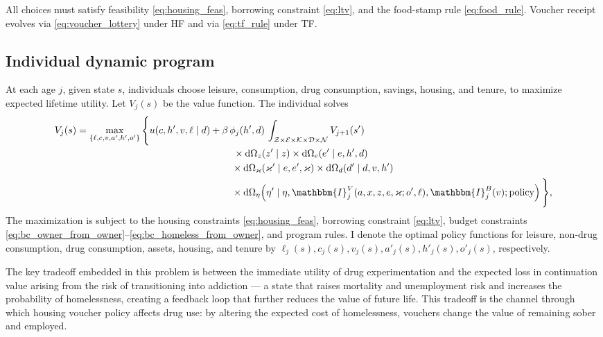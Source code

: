 \documentclass[parskip=full]{article}
\theoremstyle{plain}
\theoremstyle{definition}
\theoremstyle{remark}
\begin{document}
All choices must satisfy feasibility \eqref{eq:housing_feas}, borrowing constraint \eqref{eq:ltv}, and the food-stamp rule \eqref{eq:food_rule}. Voucher receipt evolves via \eqref{eq:voucher_lottery} under HF and via \eqref{eq:tf_rule} under TF.

\subsection{Individual dynamic program}\label{sec:hh}

At each age $j$, given state $s$, individuals choose leisure, consumption, drug consumption, savings, housing, and tenure, to maximize expected lifetime utility. Let $V_j(s)$ be the value function. The individual solves
\begin{equation}\label{eq:bellman}
\begin{alignedat}{2}
V_j(s)&=\max_{\{\ell,c,v,a',h',o'\}}\Bigg\{u(c,h',v,\ell\mid d)
+\beta\,\phi_j(h',d)\,\int_{\mathcal{Z}\times\mathcal{E}\times\mathcal{K}\times\mathcal{D}\times\mathcal{N}} V_{j+1}(s') \\[-0.25ex]
&\qquad\qquad\qquad\qquad\qquad\qquad\qquad\qquad
\,\times \mathrm{d}\Omega_z(z'\mid z)\times \mathrm{d}\Omega_e(e'\mid e,h',d) \\ &\qquad\qquad\qquad\qquad\qquad\qquad\qquad\qquad 
\times \mathrm{d}\Omega_{\varkappa}(\varkappa' \mid e,e',\varkappa)\times \mathrm{d}\Omega_d(d'\mid d,v,h')\,
\\ &\qquad\qquad\qquad\qquad\qquad\qquad\qquad\qquad  \times \mathrm{d}\Omega_\eta\!\left(\eta' \mid \eta,\mathbbm{I}_j^{V}(a,x,z,e,\varkappa;o',\ell),\mathbbm{I}_j^{B}(v);\text{policy}\right)
\Bigg\},
\end{alignedat}
\end{equation}
The maximization is subject to the housing constraints \eqref{eq:housing_feas}, borrowing constraint \eqref{eq:ltv}, budget constraints \eqref{eq:bc_owner_from_owner}--\eqref{eq:bc_homeless_from_owner}, and program rules. I denote the optimal policy functions for leisure, non-drug consumption, drug consumption, assets, housing, and tenure by $\ell_j(s),c_j(s),v_j(s),a'_j(s),h'_j(s),o'_j(s)$, respectively.

The key tradeoff embedded in this problem is between the immediate 
utility of drug experimentation and the expected loss in continuation 
value arising from the risk of transitioning into addiction — a state 
that raises mortality and unemployment risk and increases the 
probability of homelessness, creating a feedback loop that further 
reduces the value of future life. This tradeoff is the channel through 
which housing voucher policy affects drug use: by altering the expected cost of homelessness, vouchers change the value of remaining sober and employed.
\end{document}
